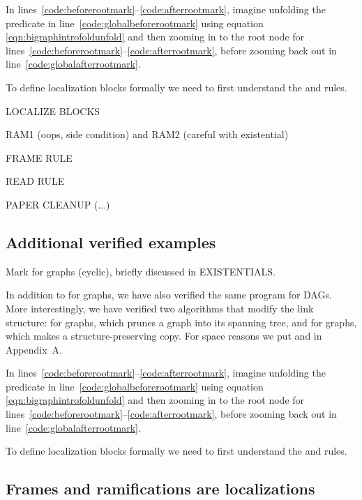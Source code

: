 In lines~\ref{code:beforerootmark}--\ref{code:afterrootmark}, imagine unfolding the  predicate in line~\ref{code:globalbeforerootmark} using equation \eqref{eqn:bigraphintrofoldunfold} and then zooming in to the root node  for lines~\ref{code:beforerootmark}--\ref{code:afterrootmark}, before zooming back out in line~\ref{code:globalafterrootmark}.

To define localization blocks formally we need to first understand the  and  rules.


LOCALIZE BLOCKS

RAM1 (oops, side condition) and RAM2 (careful with existential)

FRAME RULE

READ RULE

PAPER CLEANUP (...)

\subsection{Additional verified examples}
\label{sec:application}

Mark for graphs (cyclic), briefly discussed in EXISTENTIALS.  

In addition to  for graphs, we have also verified the same program for DAGs.
More interestingly, we have verified two algorithms that modify the link structure:
 for graphs, which prunes a graph into its spanning tree, and 
for graphs, which makes a structure-preserving copy.  For space reasons we put
 and  in Appendix~A\hide{\ref{apx:spanning}}.




In lines~\ref{code:beforerootmark}--\ref{code:afterrootmark}, imagine unfolding the  predicate in line~\ref{code:globalbeforerootmark} using equation \eqref{eqn:bigraphintrofoldunfold} and then zooming in to the root node  for lines~\ref{code:beforerootmark}--\ref{code:afterrootmark}, before zooming back out in line~\ref{code:globalafterrootmark}.

To define localization blocks formally we need to first understand the  and  rules.

\subsection{Frames and ramifications are localizations}

